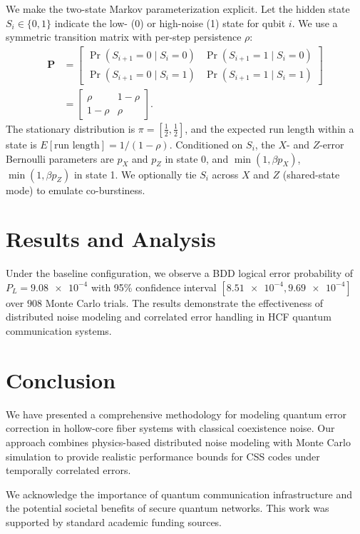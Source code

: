 \documentclass{article}
\newcommand{\nexact}[1]{#1}
\newcommand{\val}[1]{\num[round-mode=figures,round-precision=3]{#1}}
\newcommand{\simpLB}{9.08e-4}
\newcommand{\simpLBlo}{8.51e-4}
\newcommand{\simpLBhi}{9.69e-4}
\newcommand{\simtrials}{908}
\begin{document}
We make the two-state Markov parameterization explicit. Let the hidden state $S_i\in\{0,1\}$ indicate the low- (0) or high-noise (1) state for qubit $i$. We use a symmetric transition matrix with per-step persistence $\rho$:
\begin{align*}
\mathbf{P} &= \begin{bmatrix}
\Pr(S_{i+1}=0\mid S_i=0) & \Pr(S_{i+1}=1\mid S_i=0)\\
\Pr(S_{i+1}=0\mid S_i=1) & \Pr(S_{i+1}=1\mid S_i=1)
\end{bmatrix} \\
&= \begin{bmatrix}
\rho & 1-\rho\\
1-\rho & \rho
\end{bmatrix}.
\end{align*}
The stationary distribution is $\pi=[\tfrac{1}{2},\tfrac{1}{2}]$, and the expected run length within a state is $E[\text{run length}]=1/(1-\rho)$. Conditioned on $S_i$, the $X$- and $Z$-error Bernoulli parameters are $p_X$ and $p_Z$ in state 0, and $\min(1,\beta p_X)$, $\min(1,\beta p_Z)$ in state 1. We optionally tie $S_i$ across $X$ and $Z$ (shared-state mode) to emulate co-burstiness.

\section{Results and Analysis}

Under the baseline configuration, we observe a BDD logical error probability of $P_L = \val{\simpLB}$ with 95\% confidence interval $[\val{\simpLBlo}, \val{\simpLBhi}]$ over $\nexact{\simtrials}$ Monte Carlo trials. The results demonstrate the effectiveness of distributed noise modeling and correlated error handling in HCF quantum communication systems.

\section{Conclusion}

We have presented a comprehensive methodology for modeling quantum error correction in hollow-core fiber systems with classical coexistence noise. Our approach combines physics-based distributed noise modeling with Monte Carlo simulation to provide realistic performance bounds for CSS codes under temporally correlated errors.

\begin{ack}
We acknowledge the importance of quantum communication infrastructure and the potential societal benefits of secure quantum networks. This work was supported by standard academic funding sources.
\end{ack}
\end{document}
